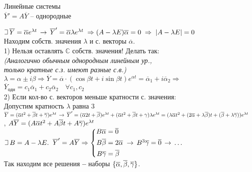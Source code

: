 \documentclass[11pt,a4paper]{article}
\newcommand{\romannum}[1]{\MakeUppercase{\romannumeral #1}}
\newcommand*\circled[1]{\tikz[baseline=(char.base)]{\node[shape=circle,draw,inner sep=2pt] (char) {#1};}}
\newcommand{\newgamma}{\raisebox{0.05em}{$\gamma$}}
\def\letus{%
    \mathord{\setbox0=\hbox{$\exists$}%
             \hbox{\kern 0.125\wd0%
                   \vbox to \ht0{%
                      \hrule width 0.75\wd0%
                      \vfill%
                      \hrule width 0.75\wd0}%
                   \vrule height \ht0%
                   \kern 0.125\wd0}%
           }%
    \,
}
\newcommand{\infers}{\,\to\,}
\newcommand{\textinfers}{\;\Rightarrow\;}
\newcommand{\bfend}{\textbf{--} }
\newcommand{\mat}[1]{\overline{#1}}
\begin{document}
\parbox[t][][t]{0.48\textwidth}{
{\centering %
\scalebox{1.8}{\romannum{3$'$}.} Линейные системы\\
\circled{\romannum{1}}\quad $\mat{Y}' = A\mat{Y}$ -- однородные\\\vspace{0.5em}
}

$\letus \mat{Y} = \mat{\alpha} e^{\lambda t} \infers \mat{Y}' = \mat{\alpha}\lambda e^{\lambda t} \textinfers\\ (A - \lambda E)\mat{\alpha} = 0 \textinfers |A - \lambda E| = 0$\\
Находим собств. значения $\lambda$ и с. векторы $\mat{\alpha}$.\\

1) Нельзя оставлять $\mathbb{C}$ собств. значения! Делать так:\\
\small{\it (Аналогично обычным однородным линейным ур.,\\ только кратные с.з. имеют разные с.в.)}\\
$\lambda = \alpha\pm i\beta \Rightarrow \mat{Y} = \mat{\alpha} \cdot (\cos\beta t + i\sin\beta t)e^{\alpha t} = \mat{\alpha}_1 + i\mat{\alpha}_2 \Rightarrow$\\
$\mat{Y}_{\text{одн}} = c_1\mat{\alpha}_1 + c_2\mat{\alpha}_2\quad \forall c_1, c_2$\\

2) Если кол-во с. векторов меньше кратности с. значения:\\
Допустим кратность $\lambda$ равна $3$\\
 $\mat{Y} = (\mat{\alpha}t^2 + \mat{\beta}t + \mat{\newgamma}) e^{\lambda t} \infers \mat{Y}' = (\mat{\alpha} 2t + \mat{\beta})e^{\lambda t} + (\mat{\alpha}t^2 + \mat{\beta} t + \newgamma)\lambda e^{\lambda t} = (\lambda \mat{\alpha}t^2 + (2\mat{\alpha} + \lambda\mat{\beta})t + (\mat{\beta} + \lambda\mat{\newgamma}) )e^{\lambda t}   $, $A\mat{Y} = (A\mat{\alpha}t^2 + A\mat{\beta}t + A\mat{\newgamma}) e^{\lambda t}$\\
 $\letus B = A - \lambda E.\;\;\mat{Y}' = A\mat{Y} \Rightarrow \left\{ \begin{aligned}
B\mat{\alpha} &= \mat{0}\\
B\mat{\beta} &= 2\mat{\alpha}\\
B\mat{\newgamma} &= \mat{\beta}\\
\end{aligned} \right. \infers B^3\mat{\newgamma} = \mat{0} \infers\ldots$\\
Так находим все решения \bfend наборы $\{\mat{\alpha}, \mat{\beta}, \mat{\newgamma}\}$.\\


}
\end{document}
